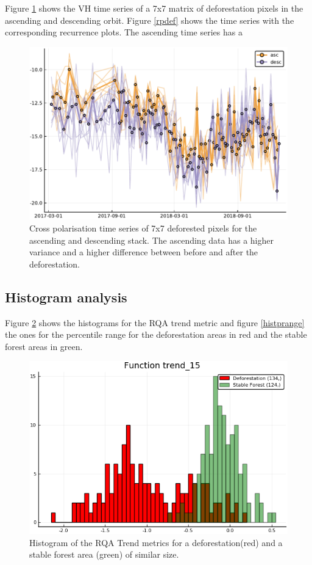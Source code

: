\documentclass{article}
\begin{document}
Figure \ref{ts_a_d} shows the VH time series of a 7x7 matrix of deforestation pixels in the ascending and descending orbit.
Figure \ref{rpdef} shows the time series with the corresponding recurrence plots.
The ascending time series has a

\begin{figure}
  \includegraphics[width=\textwidth]{figs/vh_a_d_timeseries.pdf}
  \caption{Cross polarisation time series of 7x7 deforested pixels for the ascending and descending stack.
            The ascending data has a higher variance and a higher difference between before and after the deforestation.
            }
  \label{ts_a_d}
\end{figure}



\subsection{Histogram analysis}

Figure \ref{histtrend} shows the histograms for the RQA trend metric and figure \ref{histprange} the ones for the percentile range for the deforestation areas in red and the stable forest areas in green.

\begin{figure}
  \includegraphics[width=\textwidth]{figs/histogram_trend1_5_0317_0319_polygon_5.png}
  \caption{Histogram of the RQA Trend metrics for a deforestation(red) and a stable forest area (green) of similar size.}
  \label{histtrend}
\end{figure}
\end{document}
